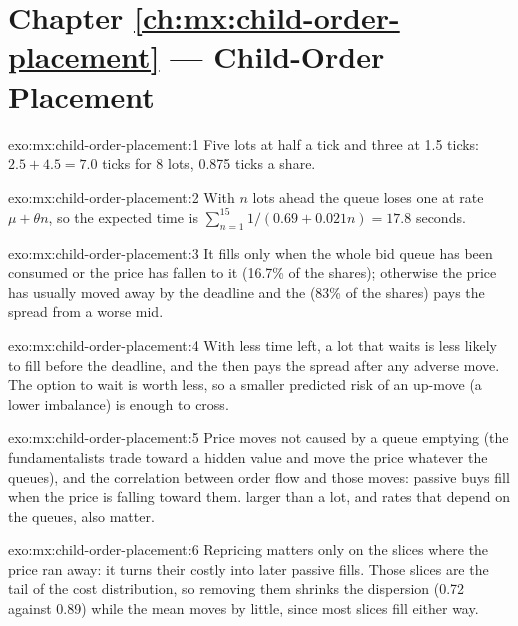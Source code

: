 \section*{Chapter \ref{ch:mx:child-order-placement} --- Child-Order Placement}

\begin{solution}{exo:mx:child-order-placement:1}
Five lots at half a tick and three at 1.5 ticks: $2.5+4.5=7.0$ ticks for 8 lots, 0.875 ticks a share.
\end{solution}

\begin{solution}{exo:mx:child-order-placement:2}
With $n$ lots ahead the queue loses one at rate $\mu+\theta n$, so the expected time is $\sum_{n=1}^{15}1/(0.69+0.021n)=17.8$ seconds.
\end{solution}

\begin{solution}{exo:mx:child-order-placement:3}
It fills only when the whole bid queue has been consumed or the price has fallen to it (16.7\% of the shares); otherwise the price has usually moved away
by the deadline and the  (83\% of the shares) pays the spread from a worse mid.
\end{solution}

\begin{solution}{exo:mx:child-order-placement:4}
With less time left, a lot that waits is less likely to fill before the deadline, and the  then pays the spread after any adverse move.
The option to wait is worth less, so a smaller predicted risk of an up-move (a lower imbalance) is enough to cross.
\end{solution}

\begin{solution}{exo:mx:child-order-placement:5}
Price moves not caused by a queue emptying (the fundamentalists trade toward a hidden value and move the price whatever the queues), and the
correlation between order flow and those moves: passive buys fill when the price is falling toward them.  larger than a lot, and rates
that depend on the queues, also matter.
\end{solution}

\begin{solution}{exo:mx:child-order-placement:6}
Repricing matters only on the slices where the price ran away: it turns their costly  into later passive fills. Those slices are the
tail of the cost distribution, so removing them shrinks the dispersion (0.72 against 0.89) while the mean moves by little, since most slices fill
either way.
\end{solution}

